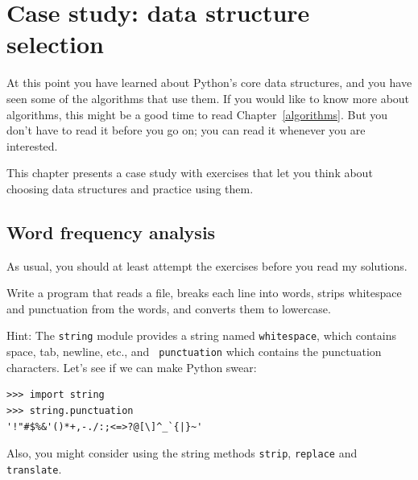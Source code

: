 \documentclass[10pt]{book}
\begin{document}




\chapter{Case study: data structure selection}

At this point you have learned about Python's core data structures,
and you have seen some of the algorithms that use them.
If you would like to know more about algorithms, this might be a good
time to read Chapter~\ref{algorithms}.
But you don't have to read it before you go on; you can read
it whenever you are interested.

This chapter presents a case study with exercises that let
you think about choosing data structures and practice using them.


\section{Word frequency analysis}
\label{analysis}

As usual, you should at least attempt the exercises
before you read my solutions.

\begin{exercise}

Write a program that reads a file, breaks each line into
words, strips whitespace and punctuation from the words, and
converts them to lowercase.

Hint: The {\tt string} module provides a string named {\tt whitespace},
which contains space, tab, newline, etc., and {\tt
  punctuation} which contains the punctuation characters.  Let's see
if we can make Python swear:

\begin{verbatim}
>>> import string
>>> string.punctuation
'!"#$%&'()*+,-./:;<=>?@[\]^_`{|}~'
\end{verbatim}
%
Also, you might consider using the string methods {\tt strip},
{\tt replace} and {\tt translate}.

\end{exercise}
\end{document}
